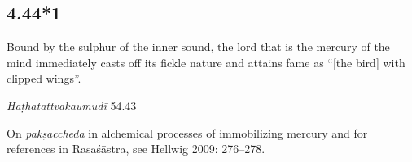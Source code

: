 \begin{ekdosis}
\subsection*{4.44*1}
\begin{translation}[hp04_044_1]
Bound by the sulphur of the inner sound, the lord that is the mercury of the mind immediately casts off its fickle nature and attains fame as “[the bird] with clipped wings”.
\end{translation} %


\begin{testimonia}[hp04_044_1]
\emph{Haṭhatattvakaumudī} 54.43
\begin{versinnote}
\end{versinnote}
\end{testimonia}

\begin{philcomm}[hp04_044_1]
On \emph{pakṣaccheda} in alchemical processes of immobilizing mercury and for references in Rasaśāstra, see Hellwig 2009: 276–278.





\end{philcomm}
\end{ekdosis}
